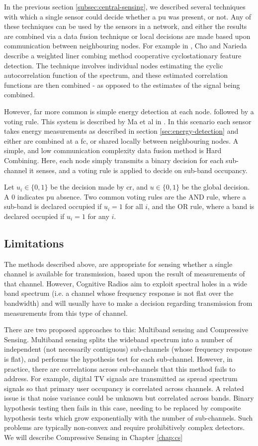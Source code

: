 In the previous section \eqref{subsec:central-sensing}, we described several techniques with which a single sensor could decide whether a \gls{pu} was present, or not. Any of these techniques can be used by the sensors in a network, and either the results are combined via a data fusion technique or local decisions are made based upon communication between neighbouring nodes. For example in \cite{cho2015weighted}, Cho and Narieda describe a weighted liner combing method cooperative cyclostationary feature detection. The technique involves individual nodes estimating the cyclic autocorrelation function of the spectrum, and these estimated correlation functions are then combined - as opposed to the estimates of the signal being combined. 

However, far more common is simple energy detection at each node. followed by a voting rule. This system is described by Ma et al in \cite{ma2008soft}. In this scenario each sensor takes energy measurements as described in section \eqref{sec:energy-detection} and either are combined at a \gls{fc}, or shared locally between neighbouring nodes. A simple, and low communication complexity data fusion method is Hard Combining. Here, each node simply transmits a binary decision for each sub-channel it senses, and a voting rule is applied to decide on sub-band occupancy. 

Let \(u_i \in \{0,1\}\) be the decision made by \gls{cr}, and \(u \in \{0,1\}\) be the global decision. A \(0\) indicates \gls{pu} absence. Two common voting rules are the AND rule, where a sub-band is declared occupied if \(u_i = 1\) for all \(i\), and the OR rule, where a band is declared occupied if \(u_i = 1\) for any \(i\).

\subsection{Limitations}
The methods described above, are appropriate for sensing whether a single channel is available for transmission, based upon the result of measurements of that channel. However, Cognitive Radios aim to exploit spectral holes in a wide band spectrum (i.e. a channel whose frequency response is not flat over the bandwidth) and will usually have to make a decision regarding transmission from measurements from this type of channel.

There are two proposed approaches to this: Multiband sensing and Compressive Sensing. Multiband sensing splits the wideband spectrum into a number of independent (not necessarily contiguous) sub-channels (whose frequency response is flat), and performs the hypothesis test for each sub-channel. However, in practice, there are correlations across sub-channels that this method fails to address. For example, digital TV signals are transmitted as spread spectrum signals so that primary user occupancy is correlated across channels. A related issue is that noise variance could be unknown but correlated across bands. Binary hypothesis testing then fails in this case, needing to be replaced by composite hypothesis tests which grow exponentially with the number of sub-channels. Such problems are typically non-convex and require prohibitively complex detectors. We will describe Compressive Sensing in Chapter \ref{chap:cs}


